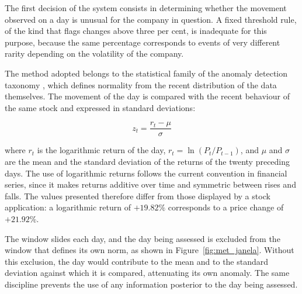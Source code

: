 The first decision of the system consists in determining whether the movement observed on a day is
unusual for the company in question. A fixed threshold rule, of the kind that flags changes above
three per cent, is inadequate for this purpose, because the same percentage corresponds to events
of very different rarity depending on the volatility of the company.

The method adopted belongs to the statistical family of the anomaly detection taxonomy
\autocite{chandola2009anomaly}, which defines normality from the recent distribution of the data
themselves. The movement of the day is compared with the recent behaviour of the same stock and
expressed in standard deviations:

\begin{equation}
z_t = \frac{r_t - \mu}{\sigma}
\label{eq:zscore}
\end{equation}

where $r_t$ is the logarithmic return of the day, $r_t = \ln(P_t / P_{t-1})$, and $\mu$ and
$\sigma$ are the mean and the standard deviation of the returns of the twenty preceding days. The
use of logarithmic returns follows the current convention in financial series, since it makes
returns additive over time and symmetric between rises and falls. The values presented therefore
differ from those displayed by a stock application: a logarithmic return of $+19.82\%$ corresponds
to a price change of $+21.92\%$.

The window slides each day, and the day being assessed is excluded from the window that defines
its own norm, as shown in Figure~\ref{fig:met_janela}. Without this exclusion, the day would
contribute to the mean and to the standard deviation against which it is compared, attenuating its
own anomaly. The same discipline prevents the use of any information posterior to the day being
assessed.

